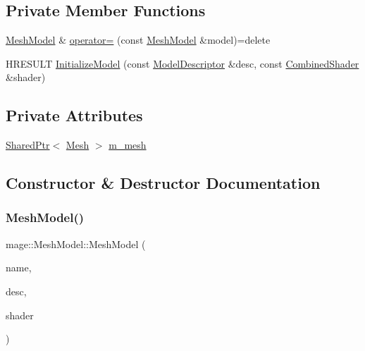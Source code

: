 \subsection*{Private Member Functions}
\begin{DoxyCompactItemize}
\item 
\hyperlink{classmage_1_1_mesh_model}{Mesh\+Model} \& \hyperlink{classmage_1_1_mesh_model_a0cffe92f76d2470c67ae71a5a4046259}{operator=} (const \hyperlink{classmage_1_1_mesh_model}{Mesh\+Model} \&model)=delete
\item 
H\+R\+E\+S\+U\+LT \hyperlink{classmage_1_1_mesh_model_a9971552f5c866b8ed221df056c46a42d}{Initialize\+Model} (const \hyperlink{classmage_1_1_model_descriptor}{Model\+Descriptor} \&desc, const \hyperlink{structmage_1_1_combined_shader}{Combined\+Shader} \&shader)
\end{DoxyCompactItemize}
\subsection*{Private Attributes}
\begin{DoxyCompactItemize}
\item 
\hyperlink{namespacemage_a1e01ae66713838a7a67d30e44c67703e}{Shared\+Ptr}$<$ \hyperlink{classmage_1_1_mesh}{Mesh} $>$ \hyperlink{classmage_1_1_mesh_model_ad9d71a65feff8c14b7272891cd42cfd4}{m\+\_\+mesh}
\end{DoxyCompactItemize}


\subsection{Constructor \& Destructor Documentation}
\hypertarget{classmage_1_1_mesh_model_a95d70993b56b1a649797880583daf3db}{}\label{classmage_1_1_mesh_model_a95d70993b56b1a649797880583daf3db} 
\subsubsection{\texorpdfstring{Mesh\+Model()}{MeshModel()}\hspace{0.1cm}{\footnotesize\ttfamily [1/2]}}
{\footnotesize\ttfamily mage\+::\+Mesh\+Model\+::\+Mesh\+Model (\begin{DoxyParamCaption}\item[{const string \&}]{name,  }\item[{const \hyperlink{classmage_1_1_model_descriptor}{Model\+Descriptor} \&}]{desc,  }\item[{const \hyperlink{structmage_1_1_combined_shader}{Combined\+Shader} \&}]{shader }\end{DoxyParamCaption})}

